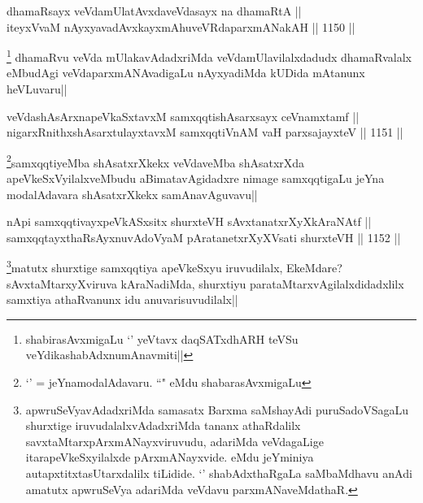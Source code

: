 \begin{shl}
dhamaRsayx veVdamUlatAvxdaveVdasayx na dhamaRtA ||  \\
iteyxVvaM nAyxyavadAvxkayxmAhuveVRdaparxmANakAH ||  1150 ||  
\end{shl}

\begin{artha}
\footnote{shabirasAvxmigaLu `\stext' yeVtavx daqSATxdhARH teVSu  veYdikashabAdxnumAnavmiti||} dhamaRvu veVda mUlakavAdadxriMda veVdamUlavilalxdadudx dhamaRvalalx eMbudAgi veVdaparxmANAvadigaLu nAyxyadiMda kUDida mAtanunx heVLuvaru||
\end{artha}


\begin{shl}
veVdashAsArxnapeVkaSxtavxM samxqqtishAsarxsayx ceVnamxtamf ||  \\
nigarxRnithxshAsarxtulayxtavxM samxqqtiVnAM vaH parxsajayxteV ||  1151 ||  
\end{shl}

\begin{artha}
\footnote{`\stext' = jeYnamodalAdavaru. ``\stext" eMdu shabarasAvxmigaLu}samxqqtiyeMba shAsatxrXkekx veVdaveMba shAsatxrXda apeVkeSxVyilalxveMbudu aBimatavAgidadxre nimage samxqqtigaLu jeYna modalAdavara shAsatxrXkekx samAnavAguvavu||
\end{artha}


\begin{shl}
nApi samxqqtivayxpeVkASx\s sitx shurxteVH sAvxtanatxrXyXkAraNAtf || \\
samxqqtayxthaRsAyxnuvAdoV\s yaM pAratanetxrXyXV\s sati shurxteVH ||  1152 ||  
\end{shl}

\begin{artha}
\footnote{apwruSeVyavAdadxriMda samasatx Barxma saMshayAdi puruSadoVSagaLu shurxtige iruvudalalxvAdadxriMda tananx athaRdalilx savxtaMtarxpArxmANayxviruvudu, adariMda veVdagaLige itarapeVkeSxyilalxde pArxmANayxvide. eMdu jeYminiya autapxtitxtasUtarxdalilx tiLidide. `\stext' shabAdxthaRgaLa saMbaMdhavu anAdi amatutx apwruSeVya adariMda veVdavu parxmANaveMdathaR.}matutx shurxtige samxqqtiya apeVkeSxyu iruvudilalx, EkeMdare? sAvxtaMtarxyXviruva kAraNadiMda, shurxtiyu parataMtarxvAgilalxdidadxlilx samxtiya athaRvanunx idu anuvarisuvudilalx||
\end{artha}

